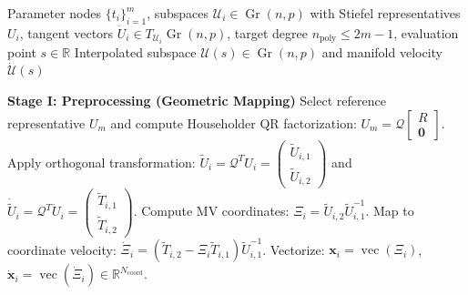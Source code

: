 \documentclass[11pt]{article}
\DeclareMathOperator{\Gr}{Gr}
\begin{document}
\begin{algorithm}[H]
\caption{Grassmann Hermite Interpolation via MV-CV+A}
\label{alg:grassmann_hermite}
\begin{algorithmic}[1]
\REQUIRE Parameter nodes $\{t_i\}_{i=1}^m$, subspaces $\mathcal{U}_i \in \Gr(n, p)$ with Stiefel representatives $U_i$, tangent vectors $\dot{U}_i \in T_{\mathcal{U}_i}\Gr(n, p)$, target degree $n_{\text{poly}} \le 2m-1$, evaluation point $s \in \mathbb{R}$
\ENSURE Interpolated subspace $\mathcal{U}(s) \in \Gr(n, p)$ and manifold velocity $\dot{\mathcal{U}}(s)$

\medskip
\STATE \textbf{Stage I: Preprocessing (Geometric Mapping)}
\STATE Select reference representative $U_m$ and compute Householder QR factorization: $U_m = \mathcal{Q} \begin{bmatrix} R \\ \mathbf{0} \end{bmatrix}$.
\STATE Apply orthogonal transformation: $\tilde{U}_i = \mathcal{Q}^T U_i = \begin{pmatrix} \tilde{U}_{i,1} \\ \tilde{U}_{i,2} \end{pmatrix}$ and $\dot{\tilde{U}}_i = \mathcal{Q}^T \dot{U}_i = \begin{pmatrix} \tilde{T}_{i,1} \\ \tilde{T}_{i,2} \end{pmatrix}$.
\STATE Compute MV coordinates: $\Xi_i = \tilde{U}_{i,2} \tilde{U}_{i,1}^{-1}$.
\STATE Map to coordinate velocity: $\dot{\Xi}_i = (\tilde{T}_{i,2} - \Xi_i \tilde{T}_{i,1}) \tilde{U}_{i,1}^{-1}$.
\STATE Vectorize: $\mathbf{x}_i = \operatorname{vec}(\Xi_i)$, $\dot{\mathbf{x}}_i = \operatorname{vec}(\dot{\Xi}_i) \in \mathbb{R}^{N_{\text{coord}}}$.
\ENDFOR


\end{algorithmic}
\end{algorithm}
\end{document}
